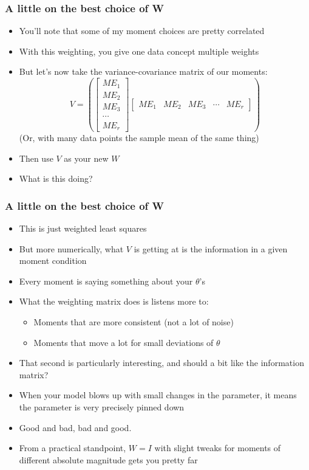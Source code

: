 \documentclass{beamer}
\begin{document}
\begin{frame}
\frametitle{A little on the best choice of W}
\begin{itemize}
\item You'll note that some of my moment choices are pretty correlated
\item With this weighting, you give one data concept multiple weights
\item But let's now take the variance-covariance matrix of our moments:
$$V=\left(\left[\begin{array}{c}ME_1 \\ ME_2 \\ ME_3 \\ \cdots \\ ME_r\end{array}\right]\left[\begin{array}{ccccc}ME_1 & ME_2 & ME_3 & \cdots & ME_r\end{array}\right]\right)$$
(Or, with many data points the sample mean of the same thing)
\item Then use $V$ as your new $W$
\item What is this doing?
\end{itemize}
\end{frame}

\begin{frame}
\frametitle{A little on the best choice of W}
\begin{itemize}
\item This is just weighted least squares
\bigskip
\item But more numerically, what $V$ is getting at is the information in a given moment condition
\bigskip
\item Every moment is saying something about your $\theta$'s
\bigskip
\item What the weighting matrix does is listens more to:
\begin{itemize}
\item Moments that are more consistent (not a lot of noise)
\item Moments that move a lot for small deviations of $\theta$
\end{itemize}
\item That second is particularly interesting, and should a bit like the information matrix?
\item When your model blows up with small changes in the parameter, it means the parameter is very precisely pinned down
\item Good and bad, bad and good.
\item From a practical standpoint, $W=I$ with slight tweaks for moments of different absolute magnitude gets you pretty far
\end{itemize}
\end{frame}
\end{document}
